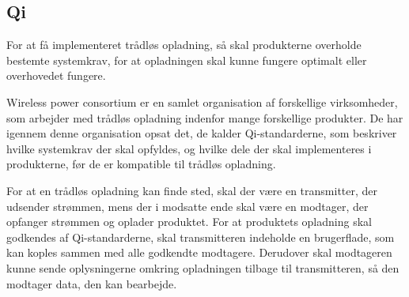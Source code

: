 \subsection{Qi}
For at få implementeret trådløs opladning, så skal produkterne overholde bestemte systemkrav, for at opladningen skal kunne fungere optimalt eller overhovedet fungere.

Wireless power consortium er en samlet organisation af forskellige virksomheder, som arbejder med trådløs opladning indenfor mange forskellige produkter. De har igennem denne organisation opsat det, de kalder Qi-standarderne, som beskriver hvilke systemkrav der skal opfyldes, og hvilke dele der skal implementeres i produkterne, før de er kompatible til trådløs opladning.

For at en trådløs opladning kan finde sted, skal der være en transmitter, der udsender strømmen, mens der i modsatte ende skal være en modtager, der opfanger strømmen og oplader produktet. For at produktets opladning skal godkendes af Qi-standarderne, skal transmitteren indeholde en brugerflade, som kan koples sammen med alle godkendte modtagere. Derudover skal modtageren kunne sende oplysningerne omkring opladningen tilbage til transmitteren, så den modtager data, den kan bearbejde.
